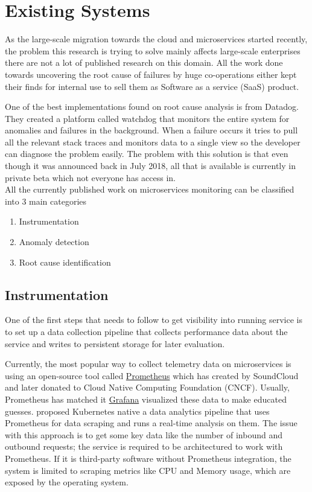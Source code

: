 \section{Existing Systems}

As the large-scale migration towards the cloud and microservices started recently, the problem this research is trying to solve mainly affects large-scale enterprises there are not a lot of published research on this domain. All the work done towards uncovering the root cause of failures by huge co-operations either kept their finds for internal use to sell them as Software as a service
 (SaaS) product. 

One of the best implementations found on root cause analysis is from Datadog. They created a platform called watchdog \citep{Watchdog76:online} that monitors the entire system for anomalies and failures in the background. When a failure occurs it tries to pull all the relevant stack traces and monitors data to a single view so the developer can diagnose the problem easily. The problem with this solution is that even though it was announced back in July 2018, all that is available is currently in private beta which not everyone has access in.
\\
All the currently published work on microservices monitoring can be classified into 3 main categories
\begin{enumerate}
\item Instrumentation
\item Anomaly detection
\item Root cause identification
\end{enumerate}

\subsection{Instrumentation}
One of the first steps that needs to follow to get visibility into running service is to set up a data collection pipeline that collects performance data about the service and writes to persistent storage for later evaluation. 

Currently, the most popular way to collect telemetry data on microservices is using an open-source tool called \href{https://prometheus.io/}{Prometheus} which has created by SoundCloud and later donated to Cloud Native Computing Foundation (CNCF). Usually, Prometheus has matched it \href{https://grafana.com/}{Grafana} visualized these data to make educated guesses. \cite{toka2021predicting} proposed Kubernetes native a data analytics pipeline that uses Prometheus for data scraping and runs a real-time analysis on them. The issue with this approach is to get some key data like the number of inbound and outbound requests; the service is required to be architectured to work with Prometheus. If it is third-party software without Prometheus integration, the system is limited to scraping metrics like CPU and Memory usage, which are exposed by the operating system.

